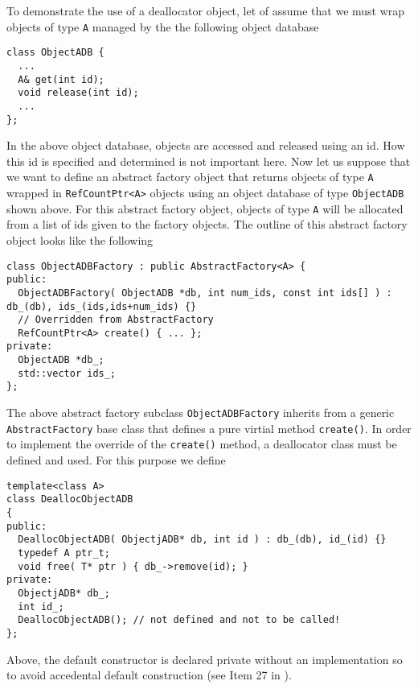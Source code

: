 To demonstrate the use of a deallocator object, let of assume that we
must wrap objects of type {}\texttt{A} managed by the the following
object database
%
{\scriptsize\begin{verbatim}
class ObjectADB {
  ...
  A& get(int id);
  void release(int id);
  ...
};
\end{verbatim}}
%
In the above object database, objects are accessed and released using
an id.  How this id is specified and determined is not important here.
Now let us suppose that we want to define an abstract factory object
that returns objects of type {}\texttt{A} wrapped in
{}\texttt{RefCountPtr<A>} objects using an object database of type
{}\texttt{ObjectADB} shown above.  For this abstract factory object,
objects of type {}\texttt{A} will be allocated from a list of ids
given to the factory objects.  The outline of this abstract factory
object looks like the following
%
{\scriptsize\begin{verbatim}
class ObjectADBFactory : public AbstractFactory<A> {
public:
  ObjectADBFactory( ObjectADB *db, int num_ids, const int ids[] ) : db_(db), ids_(ids,ids+num_ids) {}
  // Overridden from AbstractFactory
  RefCountPtr<A> create() { ... };
private:
  ObjectADB *db_;
  std::vector ids_;
};
\end{verbatim}}
%
The above abstract factory subclass {}\texttt{ObjectADBFactory}
inherits from a generic {}\texttt{AbstractFactory} base class that
defines a pure virtial method {}\texttt{create()}.  In order to
implement the override of the {}\texttt{create()} method, a
deallocator class must be defined and used.  For this purpose we
define
%
{\scriptsize\begin{verbatim}
template<class A>
class DeallocObjectADB
{
public:
  DeallocObjectADB( ObjectjADB* db, int id ) : db_(db), id_(id) {}
  typedef A ptr_t;
  void free( T* ptr ) { db_->remove(id); }
private:
  ObjectjADB* db_;
  int id_;
  DeallocObjectADB(); // not defined and not to be called!
};
\end{verbatim}}
%
\noindent{}
Above, the default constructor is declared private without an
implementation so to avoid accedental default construction (see Item
27 in {}\cite{ref:meyers_1994}).

